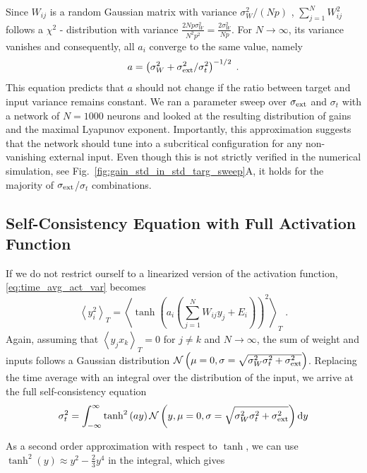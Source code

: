\documentclass[10pt,a4paper]{article}
\newcommand{\avgt}[1]{\left< #1 \right>_T}
\begin{document}
Since $W_{ij}$ is a random Gaussian matrix with variance $\sigma_{W}^2/\left( N p \right)$ , $\sum_{j=1}^{N} W_{ij}^2$ follows a $\chi^2$ - distribution with variance $\frac{2N p \sigma_{W}^2}{N^2 p^2} = \frac{2 \sigma_{W}^2}{N p}$. For $N \rightarrow \infty $, its variance vanishes and consequently, all $a_i$ converge to the same value, namely 
\begin{equation}
	a = \left(\sigma_{W}^2 + \sigma_{\rm ext}^2 / \sigma_{t}^2\right)^{-1/2} \; . \label{eq:gain_pred}
\end{equation}
This equation predicts that $a$ should not change if the ratio between target and input variance remains constant. We ran a parameter sweep over $\sigma_{\rm ext}$ and $\sigma_{t}$ with a network of $N = 1000$ neurons and looked at the resulting distribution of gains and the maximal Lyapunov exponent. Importantly, this approximation suggests that the network should tune into a subcritical configuration for any non-vanishing external input. Even though this is not strictly verified in the numerical simulation, see Fig.~\ref{fig:gain_std_in_std_targ_sweep}A, it holds for the majority of $ \sigma_{\rm ext}$/$\sigma_{t}$ combinations.

\subsection{Self-Consistency Equation with Full Activation Function}
If we do not restrict ourself to a linearized version of the activation function, \eqref{eq:time_avg_act_var} becomes
\begin{equation}
	\avgt{y_i^2} = \avgt{\tanh\left(a_i\left(\sum_{j=1}^{N} W_{ij} y_j + E_i\right)\right)^2} \; .
\end{equation}
Again, assuming that $\avgt{y_j x_k}=0$ for $j\neq k$ and $N \rightarrow \infty$, the sum of weight and inputs follows a Gaussian distribution $\mathcal{N}\left(\mu = 0, \sigma = \sqrt{\sigma^2_{W}\sigma^2_{t} + \sigma^2_{\rm ext}}\right)$. Replacing the time average with an integral over the distribution of the input, we arrive at the full self-consistency equation
\begin{equation}
	\sigma^2_{t} = \int_{-\infty}^{\infty}  \tanh^2\left(ay\right) \mathcal{N}\left(y, \mu = 0, \sigma = \sqrt{\sigma^2_{W}\sigma^2_{t} + \sigma^2_{\rm ext}}\right)	\mathrm{d}y \label{eq:self-consistency_var_full}
\end{equation}

As a second order approximation with respect to $\tanh$, we can use $\tanh^2(y) \approx y^2 - \frac{2}{3} y^4$ in the integral, which gives
\end{document}
